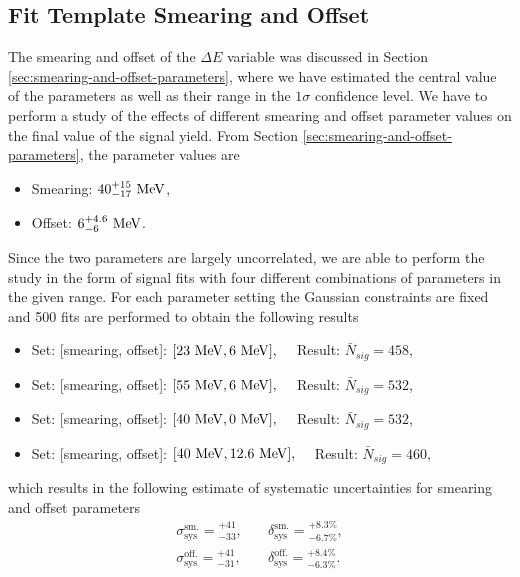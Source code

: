\subsection{Fit Template Smearing and Offset}
The smearing and offset of the $\Delta E$ variable was discussed in Section \ref{sec:smearing-and-offset-parameters}, where we have estimated the central value of the parameters as well as their range in the $1\sigma$ confidence level. We have to perform a study of the effects of different smearing and offset parameter values on the final value of the signal yield. From Section \ref{sec:smearing-and-offset-parameters}, the parameter values are
\begin{itemize}
	\item Smearing: $40_{-17}^{+15}\mathrm{~MeV}$,
	\item Offset: $6_{-6}^{+4.6}\mathrm{~MeV}$.
\end{itemize}
Since the two parameters are largely uncorrelated, we are able to perform the study in the form of signal fits with four different combinations of parameters in the given range. For each parameter setting the Gaussian constraints are fixed and 500 fits are performed to obtain the following results
\begin{itemize}
	\item Set: [smearing, offset]: $[23\mathrm{~MeV},6\mathrm{~MeV}],\quad$ Result: $ \bar N {}_{sig} = 458 $,
	\item Set: [smearing, offset]: $[55\mathrm{~MeV},6\mathrm{~MeV}],\quad$ Result: $ \bar N {}_{sig} = 532 $,
	\item Set: [smearing, offset]: $[40\mathrm{~MeV},0\mathrm{~MeV}],\quad$ Result: $ \bar N {}_{sig} = 532 $,
	\item Set: [smearing, offset]: $[40\mathrm{~MeV},12.6\mathrm{~MeV}],\quad$ Result: $ \bar N {}_{sig} = 460 $,
\end{itemize}
which results in the following estimate of systematic uncertainties for smearing and offset parameters
\begin{align}
\sigma_{\mathrm{sys}}^{\mathrm{sm.}} = {}^{+41}_{-33},&\quad \delta_{\mathrm{sys}}^{\mathrm{sm.}} = {}^{+8.3\%}_{-6.7\%}, \\
\sigma_{\mathrm{sys}}^{\mathrm{off.}} = {}^{+41}_{-31},&\quad \delta_{\mathrm{sys}}^{\mathrm{off.}} = {}^{+8.4\%}_{-6.3\%}.
\end{align}

